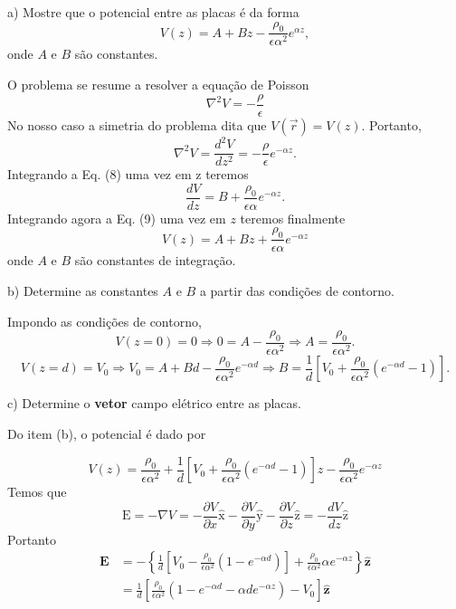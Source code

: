 \begin{enumerate}[start=1,label={\bfseries Q\arabic*.}]
a) Mostre que o potencial entre as placas é da forma
$$
V(z) = A + Bz - \frac{\rho_{0}}{\epsilon \alpha^{2}} e^{\alpha z},
$$
onde $A$ e $B$ são constantes.

\resposta O problema se resume a resolver a equação de Poisson
$$
\nabla^{2} V = - \frac{\rho}{\epsilon}
$$
No nosso caso a simetria do problema dita que $V (\vec{r}) = V (z)$. Portanto,
$$
\nabla^{2} V = \frac{d^{2} V}{dz^{2}} = - \frac{\rho}{\epsilon} e^{-\alpha z}.
$$
Integrando a Eq. (8) uma vez em z teremos
$$
\frac{dV}{dz} = B + \frac{\rho_{0}}{\epsilon \alpha} e^{-\alpha z}.
$$
Integrando agora a Eq. (9) uma vez em $z$ teremos finalmente
$$
V(z) = A + Bz + \frac{\rho_{0}}{\epsilon \alpha} e^{-\alpha z}
$$
onde $A$ e $B$ são constantes de integração.



b) Determine as constantes $A$ e $B$ a partir das condições de contorno.

\resposta Impondo as condições de contorno,
$$
V(z=0) = 0 \Rightarrow 0 = A - \frac{\rho_{0}}{\epsilon \alpha^{2}} \Rightarrow A = \frac{\rho_{0}}{\epsilon \alpha^{2}}.
$$
$$
V(z=d)=V_{0} \Rightarrow V_{0}=A+B d-\frac{\rho_{0}}{\epsilon \alpha^{2}} e^{-\alpha d} \Rightarrow B=\frac{1}{d}\left[V_{0}+\frac{\rho_{0}}{\epsilon \alpha^{2}}\left(e^{-\alpha d}-1\right)\right].
$$

c) Determine o \textbf{vetor} campo elétrico entre as placas.

\resposta Do item (b), o potencial é dado por

$$
V(z)=\frac{\rho_{0}}{\epsilon \alpha^{2}}+\frac{1}{d}\left[V_{0}+\frac{\rho_{0}}{\epsilon \alpha^{2}}\left(e^{-\alpha d}-1\right)\right] z-\frac{\rho_{0}}{\epsilon \alpha^{2}} e^{-\alpha z}
$$
Temos que
$$
\mathrm{E}=-\nabla V=-\frac{\partial V}{\partial x} \hat{\mathrm{x}}-\frac{\partial V}{\partial y} \hat{\mathrm{y}}-\frac{\partial V}{\partial z} \hat{\mathrm{z}}=-\frac{d V}{d z} \hat{\mathrm{z}}
$$
Portanto
$$
\begin{aligned}
\mathbf{E} &=-\left\{\frac{1}{d}\left[V_{0}-\frac{\rho_{0}}{\epsilon \alpha^{2}}\left(1-e^{-\alpha d}\right)\right]+\frac{\rho_{0}}{\epsilon \alpha^{2}} \alpha e^{-\alpha z}\right\} \hat{\mathbf{z}} \\
&=\frac{1}{d}\left[\frac{\rho_{0}}{\epsilon \alpha^{2}}\left(1-e^{-\alpha d}-\alpha d e^{-\alpha z}\right)-V_{0}\right] \hat{\mathbf{z}}
\end{aligned}
$$









\end{enumerate}
